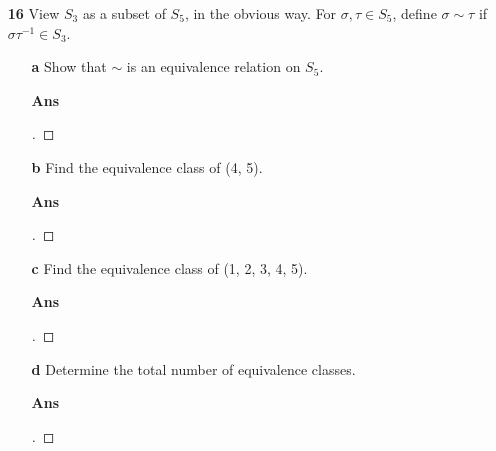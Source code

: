 \documentclass[paper=usletter, fontsize=12pt]{article}
\begin{document}
\begin{itemize}
\begin{itemize}
            \item[\textbf{16}] View $S_3$ as a subset of $S_5$, in the obvious
            way. For $\sigma, \tau \in S_5$, define $\sigma \sim \tau$ if
            $\sigma\tau^{-1} \in S_3$.
            \begin{itemize}

                \item[\textbf{a}] Show that $\sim$ is an equivalence relation
                on $S_5$.
                \item[\textbf{Ans}]
                \begin{proof}[\unskip\nopunct]
                \end{proof}
                \vspace{0.2in}

                \item[\textbf{b}] Find the equivalence class of (4, 5).
                \item[\textbf{Ans}]
                \begin{proof}[\unskip\nopunct]
                \end{proof}
                \vspace{0.2in}

                \item[\textbf{c}] Find the equivalence class of (1, 2, 3, 4, 5).
                \item[\textbf{Ans}]
                \begin{proof}[\unskip\nopunct]
                \end{proof}
                \vspace{0.2in}

                \item[\textbf{d}] Determine the total number of equivalence
                classes.
                \item[\textbf{Ans}]
                \begin{proof}[\unskip\nopunct]
                \end{proof}
                \vspace{0.2in}

            \end{itemize}

        \end{itemize}

    \end{itemize}
\end{document}
